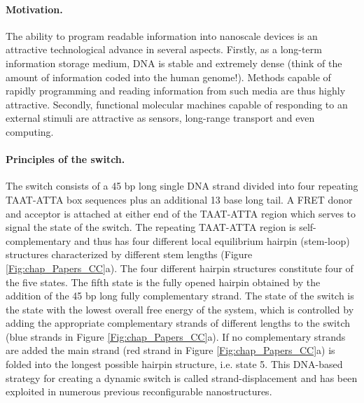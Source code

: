  \paragraph{Motivation.} The ability to program readable information into nanoscale devices is an attractive technological advance in several aspects. Firstly, as a long-term information storage medium, DNA is stable and extremely dense (think of the amount of information coded into the human genome!). Methods capable of rapidly programming and reading information from such media are thus highly attractive.\cite{Church2012,Wong2003,Portney2008} Secondly, functional molecular machines capable of responding to an external stimuli are attractive as sensors,\cite{Zhang2007b} long-range transport\cite{Wickham2012,Wickham2011,Lund2010,Douglas2012,Andersen2009} and even computing\cite{Zhang2007a,Stojanovic2002,Qian2011}.

 \paragraph{Principles of the switch.} The switch consists of a 45 bp long single DNA strand divided into four repeating TAAT-ATTA box sequences plus an additional 13 base long tail. A FRET donor and acceptor is attached at either end of the TAAT-ATTA region which serves to signal the state of the switch. The repeating TAAT-ATTA region is self-complementary and thus has four different local equilibrium hairpin (stem-loop) structures characterized by different stem lengths (Figure \ref{Fig:chap_Papers_CC}a). The four different hairpin structures constitute four of the five states. The fifth state is the fully opened hairpin obtained by the addition of the 45 bp long fully complementary strand. The state of the switch is the state with the lowest overall free energy of the system, which is controlled by adding the appropriate complementary strands of different lengths to the switch (blue strands in Figure \ref{Fig:chap_Papers_CC}a). If no complementary strands are added the main strand (red strand in Figure \ref{Fig:chap_Papers_CC}a) is folded into the longest possible hairpin structure, i.e. state 5. This DNA-based strategy for creating a dynamic switch is called strand-displacement and has been exploited in numerous previous reconfigurable nanostructures.\cite{Zhang2011}

